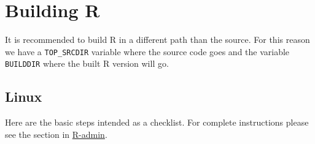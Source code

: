\documentclass[
  letterpaper,
  DIV=11,
  numbers=noendperiod]{scrreprt}
\begin{document}
\section{Building R}\label{building-r}

It is recommended to build R in a different path than the source. For
this reason we have a \texttt{TOP\_SRCDIR} variable where the source
code goes and the variable \texttt{BUILDDIR} where the built R version
will go.

\subsection{Linux}\label{linux}

Here are the basic steps intended as a checklist. For complete
instructions please see the section in
\href{https://cran.r-project.org/doc/manuals/r-devel/R-admin.html\#Installing-R-under-Unix_002dalikes}{R-admin}.
\end{document}
